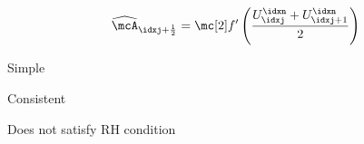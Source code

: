 \begin{defnbox}\nospacing
    \begin{defn}\label{defn:arithmetic_average_flux}
        \begin{align}
          \widehat{\mcA}_{\idxj+\frac{1}{2}}=\flux' \left(\frac{U_{\idxj}^{\idxn}+U_{\idxj+1}^{\idxn}}{2}\right)
        \end{align}
    \end{defn}
\end{defnbox}
\begin{sectionbox}\nospacing
   \begin{minipage}[t]{0.39\textwidth}
    \begin{proslist}
        \item Simple
        \item Consistent
    \end{proslist}
   \end{minipage}
   \begin{minipage}[t]{0.6\textwidth}
    \begin{conslist}
        \item Does not satisfy RH condition
    \end{conslist}
   \end{minipage}
\end{sectionbox}
